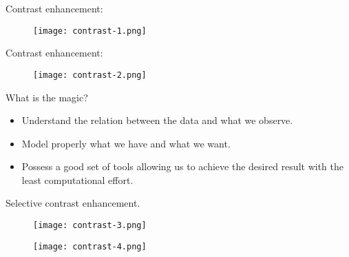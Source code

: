 \begin{frame}
Contrast enhancement:
\begin{figure}
\centering
\texttt{[image: contrast-1.png]}
\end{figure}
\end{frame}


\begin{frame}
Contrast enhancement:
\begin{figure}
\centering
\texttt{[image: contrast-2.png]}
\end{figure}
\end{frame}


\begin{frame}
What is the magic?
\begin{itemize}
\item Understand the relation between the data and what we observe.
\item Model properly what we have and what we want.
\item Possess a good set of tools allowing us to achieve the desired result with the least computational effort.
\end{itemize}
\end{frame}


\begin{frame}
Selective contrast enhancement.
\begin{figure}
\centering
\texttt{[image: contrast-3.png]}
\end{figure}
\end{frame}


\begin{frame}
\begin{figure}
\centering
\texttt{[image: contrast-4.png]}
\end{figure}
\end{frame}


